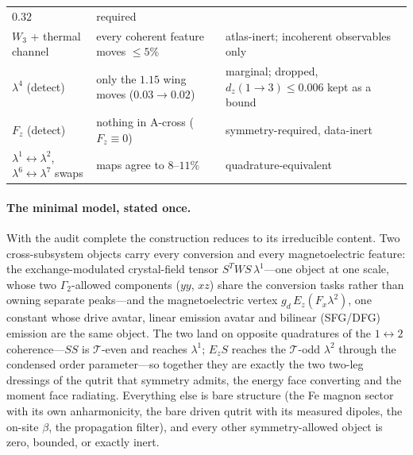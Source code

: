 \documentclass[11pt,a4paper]{article}
\begin{document}
\begin{center}
\begin{tabular}{lll}
  $0.32$ & required\\
$W_3$ + thermal channel & every coherent feature moves $\leq5\%$ &
  atlas-inert; incoherent observables only\\
$\lambda^4$ (detect) & only the $1.15$ wing moves ($0.03\to0.02$) &
  marginal; dropped, $d_z(1\!\to\!3)\leq0.006$ kept as a bound\\
$F_z$ (detect) & nothing in A-cross ($F_z\equiv0$) &
  symmetry-required, data-inert\\
$\lambda^1\!\leftrightarrow\!\lambda^2$, $\lambda^6\!\leftrightarrow\!
\lambda^7$ swaps & maps agree to $8$--$11\%$ & quadrature-equivalent\\
\bottomrule
\end{tabular}
\end{center}

\paragraph{The minimal model, stated once.}  With the audit complete
the construction reduces to its irreducible content.  Two
cross-subsystem objects carry every conversion and every
magnetoelectric feature: the exchange-modulated crystal-field tensor
$S^T W S\,\lambda^1$---one object at one scale, whose two
$\Gamma_2$-allowed components ($yy$, $xz$) share the conversion tasks
rather than owning separate peaks---and the magnetoelectric vertex
$g_d\,E_z(F_x\lambda^2)$, one constant whose drive avatar, linear
emission avatar and bilinear (SFG/DFG) emission are the same object.
The two land on opposite quadratures of the
$1\!\leftrightarrow\!2$ coherence---$SS$ is $\mathcal T$-even and
reaches $\lambda^1$; $E_zS$ reaches the $\mathcal T$-odd $\lambda^2$
through the condensed order parameter---so together they are exactly
the two two-leg dressings of the qutrit that symmetry admits, the
energy face converting and the moment face radiating.  Everything
else is bare structure (the Fe magnon sector with its own
anharmonicity, the bare driven qutrit with its measured dipoles, the
on-site $\beta$, the propagation filter), and every other
symmetry-allowed object is zero, bounded, or exactly inert.
\end{document}
